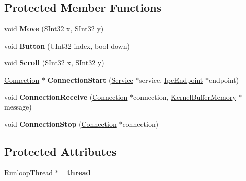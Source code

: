 \subsection*{Protected Member Functions}
\begin{DoxyCompactItemize}
\item 
\mbox{\label{class_generic_mouse_ae982497904804dc3586966dc44c087a5}} 
void {\bfseries Move} (S\+Int32 x, S\+Int32 y)
\item 
\mbox{\label{class_generic_mouse_adeeededabddd93d4c6349b98d3436e4c}} 
void {\bfseries Button} (U\+Int32 index, bool down)
\item 
\mbox{\label{class_generic_mouse_a196dfde2263e2e8fb8efda7eae07fe67}} 
void {\bfseries Scroll} (S\+Int32 x, S\+Int32 y)
\item 
\mbox{\label{class_generic_mouse_ab42c3bb04e2fd439f55c3d3a6a331051}} 
\hyperlink{class_provider_driver_1_1_connection}{Connection} $\ast$ {\bfseries Connection\+Start} (\hyperlink{class_provider_driver_1_1_service}{Service} $\ast$service, \hyperlink{class_ipc_endpoint}{Ipc\+Endpoint} $\ast$endpoint)
\item 
\mbox{\label{class_generic_mouse_a5a0092d02a7fbbf141e58d13e568640d}} 
void {\bfseries Connection\+Receive} (\hyperlink{class_provider_driver_1_1_connection}{Connection} $\ast$connection, \hyperlink{class_kernel_buffer_memory}{Kernel\+Buffer\+Memory} $\ast$message)
\item 
\mbox{\label{class_generic_mouse_a1bb452ac2b9e237ad60ddb377a514904}} 
void {\bfseries Connection\+Stop} (\hyperlink{class_provider_driver_1_1_connection}{Connection} $\ast$connection)
\end{DoxyCompactItemize}
\subsection*{Protected Attributes}
\begin{DoxyCompactItemize}
\item 
\mbox{\label{class_generic_mouse_a7c8d725fb20e262d2c7fb656a30684b4}} 
\hyperlink{class_runloop_thread}{Runloop\+Thread} $\ast$ {\bfseries \+\_\+thread}
\end{DoxyCompactItemize}
